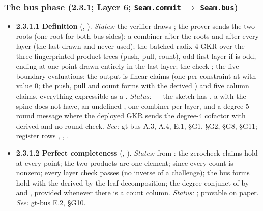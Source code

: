 \subsubsection{The bus phase (2.3.1; Layer 6; \texttt{Seam.commit} \texorpdfstring{$\to$}{to} \texttt{Seam.bus})}\label{sec:obl-phase-bus}

\begin{itemize}[label={}, leftmargin=1.3em, itemindent=-1.3em, labelwidth=0pt, labelsep=0pt, itemsep=4pt, topsep=3pt]
\item {}\label{obl:node-2.3.1.1}\oblflag\textbf{2.3.1.1 Definition} (, ). \emph{States:} the verifier draws ; the prover sends the two roots  (one root for both bus sides); a combiner  after the roots and after every layer (the last drawn and never used); the batched radix-4 GKR over the three fingerprinted product trees (push, pull, count), odd first layer if  is odd, ending at one point  drawn entirely in the last layer; the check ; the five boundary evaluations; the output is  linear claims (one per constraint at  with value 0; the push, pull and count forms with the derived ) and five column claims, everything expressible as a . \emph{Status:}   — the sketch has , a  with  the spine does not have, an undefined , one combiner per layer, and a degree-5 round message where the deployed GKR sends the degree-4 cofactor with  derived and no round check. \emph{See:} gt-bus A.3, A.4, E.1, §G1, §G2, §G8, §G11; register rows , , .
\item {}\label{obl:node-2.3.1.2}\textbf{2.3.1.2 Perfect completeness} (, ). \emph{States:} from : the zerocheck claims hold at every point; the two products are one element;  since every count is nonzero; every layer check passes (no inverse of a challenge); the bus forms hold with the derived  by the leaf decomposition; the degree conjunct of  by  and , provided  whenever there is a count column. \emph{Status:} ; provable on paper. \emph{See:} gt-bus E.2, §G10.

\end{itemize}
